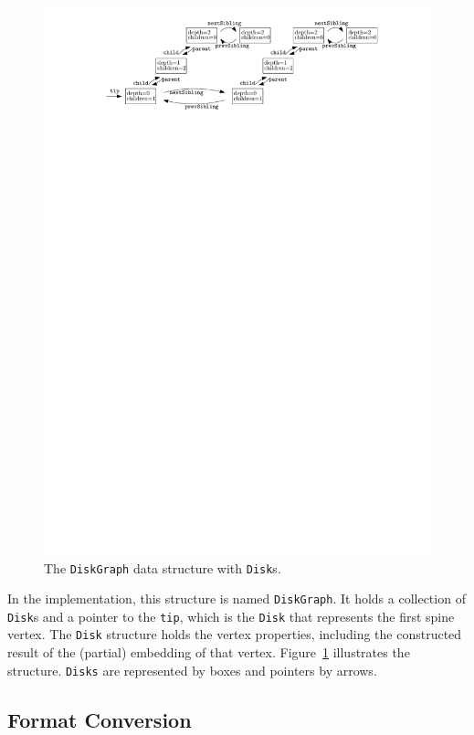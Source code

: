 \begin{figure}
    \centering
    \includegraphics{graphics/ch6_diskgraph.pdf}
    \caption[The \texttt{DiskGraph} data structure]{The \texttt{DiskGraph} data structure with \texttt{Disk}s.}
    \label{fig:ch6_diskgraph}
\end{figure}

In the implementation, this structure is named \texttt{DiskGraph}. It holds a collection of \texttt{Disk}s and a pointer to the \texttt{tip}, which is the \texttt{Disk} that represents the first spine vertex. The \texttt{Disk} structure holds the vertex properties, including the constructed result of the (partial) embedding of that vertex. Figure~\ref{fig:ch6_diskgraph} illustrates the structure. \texttt{Disks} are represented by boxes and pointers by arrows.

\subsection{Format Conversion}

